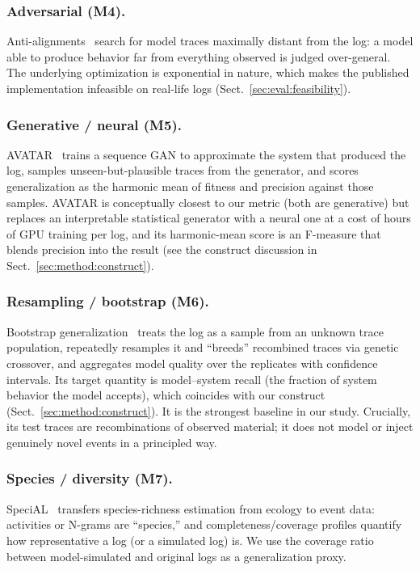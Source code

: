 \documentclass[runningheads]{llncs}
\begin{document}
\subsubsection{Adversarial (M4).}
Anti-alignments~\cite{vandongen2016anti} search for model traces maximally distant from the log: a model able to produce behavior far from everything observed is judged over-general. The underlying optimization is exponential in nature, which makes the published implementation infeasible on real-life logs (Sect.~\ref{sec:eval:feasibility}).

\subsubsection{Generative / neural (M5).}
AVATAR~\cite{theis2020avatar} trains a sequence GAN to approximate the system that produced the log, samples unseen-but-plausible traces from the generator, and scores generalization as the harmonic mean of fitness and precision against those samples. AVATAR is conceptually closest to our metric (both are generative) but replaces an interpretable statistical generator with a neural one at a cost of hours of GPU training per log, and its harmonic-mean score is an F-measure that blends precision into the result (see the construct discussion in Sect.~\ref{sec:method:construct}).

\subsubsection{Resampling / bootstrap (M6).}
Bootstrap generalization~\cite{polyvyanyy2022bootstrap} treats the log as a sample from an unknown trace population, repeatedly resamples it and ``breeds'' recombined traces via genetic crossover, and aggregates model quality over the replicates with confidence intervals. Its target quantity is model--system recall (the fraction of system behavior the model accepts), which coincides with our construct (Sect.~\ref{sec:method:construct}). It is the strongest baseline in our study. Crucially, its test traces are recombinations of observed material; it does not model or inject genuinely novel events in a principled way.

\subsubsection{Species / diversity (M7).}
SpeciAL~\cite{kabierski2023species} transfers species-richness estimation from ecology to event data: activities or N-grams are ``species,'' and completeness/coverage profiles quantify how representative a log (or a simulated log) is. We use the coverage ratio between model-simulated and original logs as a generalization proxy.
\end{document}
